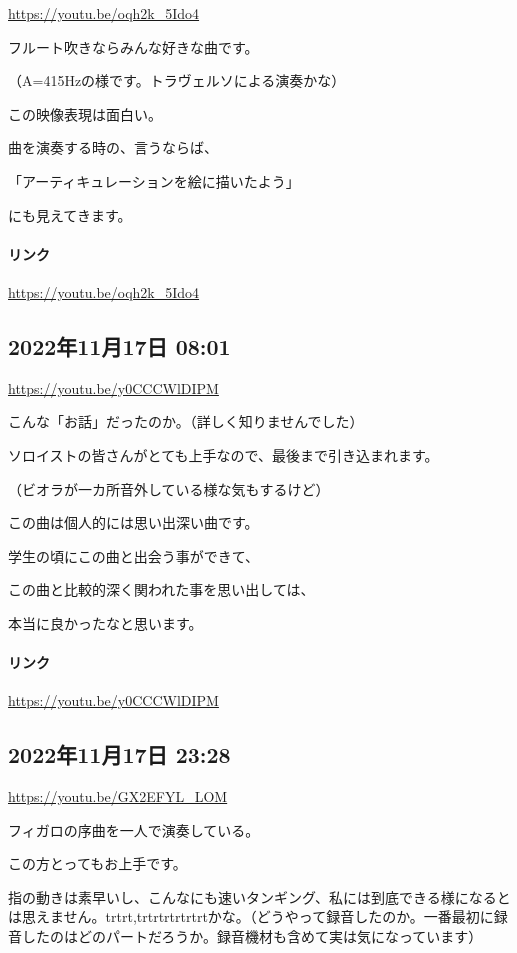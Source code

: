 \url{https://youtu.be/oqh2k_5Ido4}

フルート吹きならみんな好きな曲です。

（A=415Hzの様です。トラヴェルソによる演奏かな）

この映像表現は面白い。

曲を演奏する時の、言うならば、

「アーティキュレーションを絵に描いたよう」

にも見えてきます。

\paragraph{リンク}
\url{https://youtu.be/oqh2k_5Ido4}

\subsection*{2022年11月17日 08:01}

\url{https://youtu.be/y0CCCWlDIPM}

こんな「お話」だったのか。（詳しく知りませんでした）

ソロイストの皆さんがとても上手なので、最後まで引き込まれます。

（ビオラが一カ所音外している様な気もするけど）

この曲は個人的には思い出深い曲です。

学生の頃にこの曲と出会う事ができて、

この曲と比較的深く関われた事を思い出しては、

本当に良かったなと思います。

\paragraph{リンク}
\url{https://youtu.be/y0CCCWlDIPM}

\subsection*{2022年11月17日 23:28}

\url{https://youtu.be/GX2EFYL_LOM}

フィガロの序曲を一人で演奏している。

この方とってもお上手です。

指の動きは素早いし、こんなにも速いタンギング、私には到底できる様になるとは思えません。trtrt,trtrtrtrtrtrtかな。（どうやって録音したのか。一番最初に録音したのはどのパートだろうか。録音機材も含めて実は気になっています）

